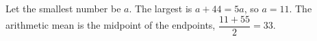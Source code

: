 Let the smallest number be $a$. The largest is $a+44=5a$, so $a=11$. The arithmetic mean is the midpoint of the endpoints, $\dfrac{11+55}{2}=\boxed{33}$.
